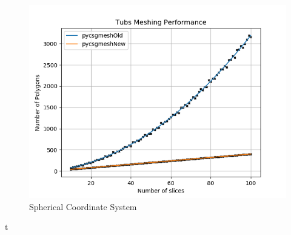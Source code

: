 \documentclass[12pt,a4paper]{article}
\begin{document}
\begin{figure}[h!]
\centering
\includegraphics[scale=0.5]{Images//Quad_fits//Tubs_quad.png}
\caption[width=\columnwidth]{Spherical Coordinate System}
\label{conts}
\end{figure}t
%
%
%
\end{document}

